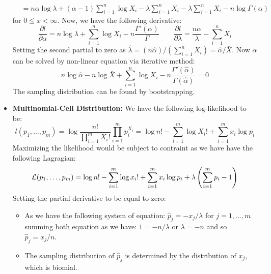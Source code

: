 \begin{example}
\begin{itemize}
\begin{equation*}
\begin{aligned}
            &= n\alpha\log\lambda + (\alpha-1)\sum^n_{i=1}\log X_i - \lambda\sum^n_{i=1}X_i - \lambda\sum^n_{i=1}X_i - n\log\Gamma(\alpha)
        \end{aligned}
        \end{equation*}
        for $0\le x<\infty$. Now, we have the following derivative:
        \begin{equation*}
            \frac{\partial l}{\partial \alpha} = n\log \lambda + \sum^n_{i=1}\log X_i - n\frac{\Gamma'(\alpha)}{\Gamma} \qquad \frac{\partial l}{\partial\lambda} = \frac{n\alpha}{\lambda} - \sum^n_{i=1}X_i
        \end{equation*}
        Setting the second partial to zero as $\hat{\lambda} = (n\hat{\alpha})/(\sum^n_{i=1}X_i) = \hat{\alpha}/\bar{X}$. Now $\alpha$ can be solved by non-linear equation via iterative method:
        \begin{equation*}
            n\log\hat{\alpha} - n\log\bar{X} + \sum^n_{i=1}\log X_i - n\frac{\Gamma'(\hat{\alpha})}{\Gamma(\hat{\alpha})} = 0
        \end{equation*}
        The sampling distribution can be found by bootstrapping. 
        \item \textbf{Multinomial-Cell Distribution:} We have the following log-likelihood to be:
        \begin{equation*}
            l(p_1,\dots,p_m) = \log \frac{n!}{\prod^m_{i=1} X_i!}\prod^m_{i=1}p_i^{X_i} = \log n! - \sum^m_{i=1}\log X_i! + \sum^m_{i=1}x_i\log p_i
        \end{equation*}
        Maximizing the likelihood would be subject to contraint as we have have the following Lagragian:
        \begin{equation*}
            \mathcal{L}(p_1,\dots,p_m) = \log n! - \sum^m_{i=1}\log x_i! + \sum^m_{i=1}x_i\log p_i + \lambda\left( \sum^m_{i=1}p_i - 1 \right)
        \end{equation*}
        Setting the partial derivative to be equal to zero: 
        \begin{itemize}
            \item As we have the following system of equation: $\hat{p}_j = -x_j/\lambda $ for $j=1,\dots,m$ summing both equation as we have: $1 = -n/\lambda$ or $\lambda =-n$ and so $\hat{p}_j = x_j/n$. 
            \item The sampling distribution of $\hat{p}_j$ is determined by the distribution of $x_j$, which is biomial.
        \end{itemize}
    \end{itemize}
\end{example}

